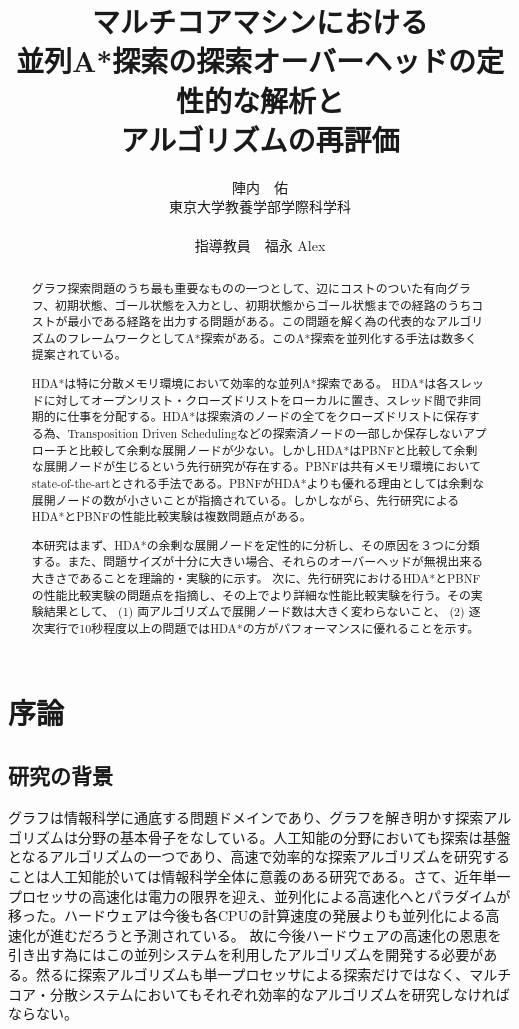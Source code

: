 \documentclass[uplatex]{jsarticle}
\title{マルチコアマシンにおける\\
並列A*探索の探索オーバーヘッドの定性的な解析と\\
アルゴリズムの再評価}
\author{陣内　佑 \\
東京大学教養学部学際科学科\\
\\
指導教員　福永 Alex}
\begin{document}
\maketitle

\begin{abstract}
グラフ探索問題のうち最も重要なものの一つとして、辺にコストのついた有向グラフ、初期状態、ゴール状態を入力とし、初期状態からゴール状態までの経路のうちコストが最小である経路を出力する問題がある。この問題を解く為の代表的なアルゴリズムのフレームワークとしてA*探索がある。このA*探索を並列化する手法は数多く提案されている。

HDA*は特に分散メモリ環境において効率的な並列A*探索である。
HDA*は各スレッドに対してオープンリスト・クローズドリストをローカルに置き、スレッド間で非同期的に仕事を分配する。HDA*は探索済のノードの全てをクローズドリストに保存する為、Transposition Driven Schedulingなどの探索済ノードの一部しか保存しないアプローチと比較して余剰な展開ノードが少ない。しかしHDA*はPBNFと比較して余剰な展開ノードが生じるという先行研究が存在する。PBNFは共有メモリ環境においてstate-of-the-artとされる手法である。PBNFがHDA*よりも優れる理由としては余剰な展開ノードの数が小さいことが指摘されている。しかしながら、先行研究によるHDA*とPBNFの性能比較実験は複数問題点がある。

本研究はまず、HDA*の余剰な展開ノードを定性的に分析し、その原因を３つに分類する。また、問題サイズが十分に大きい場合、それらのオーバーヘッドが無視出来る大きさであることを理論的・実験的に示す。
次に、先行研究におけるHDA*とPBNFの性能比較実験の問題点を指摘し、その上でより詳細な性能比較実験を行う。その実験結果として、 (1) 両アルゴリズムで展開ノード数は大きく変わらないこと、 (2) 逐次実行で10秒程度以上の問題ではHDA*の方がパフォーマンスに優れることを示す。
\end{abstract}

\newpage
\tableofcontents
\newpage

\section{序論}

\subsection{研究の背景}
グラフは情報科学に通底する問題ドメインであり、グラフを解き明かす探索アルゴリズムは分野の基本骨子をなしている。人工知能の分野においても探索は基盤となるアルゴリズムの一つであり、高速で効率的な探索アルゴリズムを研究することは人工知能於いては情報科学全体に意義のある研究である。さて、近年単一プロセッサの高速化は電力の限界を迎え、並列化による高速化へとパラダイムが移った。ハードウェアは今後も各CPUの計算速度の発展よりも並列化による高速化が進むだろうと予測されている。%
故に今後ハードウェアの高速化の恩恵を引き出す為にはこの並列システムを利用したアルゴリズムを開発する必要がある。然るに探索アルゴリズムも単一プロセッサによる探索だけではなく、マルチコア・分散システムにおいてもそれぞれ効率的なアルゴリズムを研究しなければならない。
\end{document}
